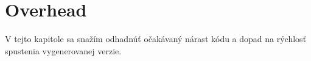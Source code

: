 \chapter{Overhead}

\label{kap:overhead} %

V tejto kapitole sa snažím odhadnúť očakávaný nárast kódu a dopad na rýchlosť spustenia vygenerovanej verzie.
